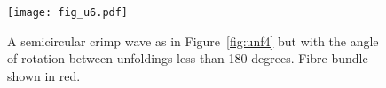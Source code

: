 %

\begin{figure}[!h]
  \centering
  \texttt{[image: fig\_u6.pdf]}
  \caption{A semicircular crimp wave as in Figure~\ref{fig:unf4} but with the angle of rotation between unfoldings less than 180 degrees. Fibre bundle shown in red.}
  \label{fig:unf6}
\end{figure}

%

